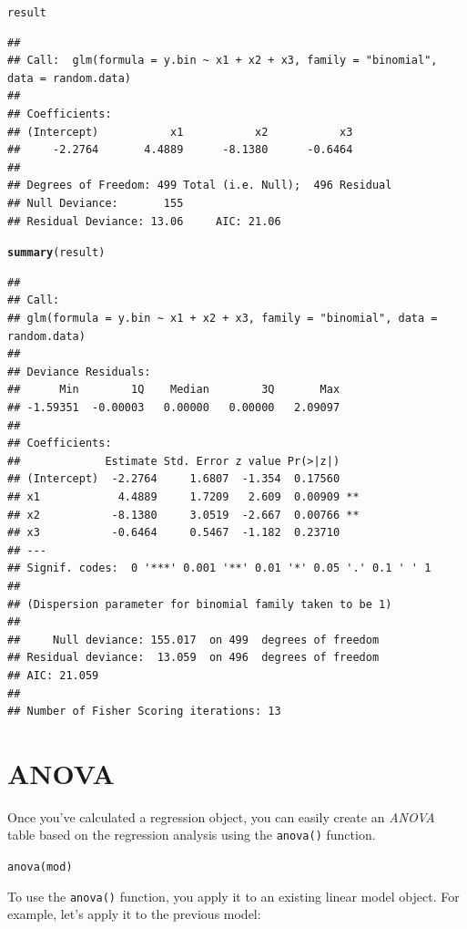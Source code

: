 \documentclass{tufte-book}\usepackage[]{graphicx}\usepackage[]{color}
\makeatletter
\newcommand{\hlstd}[1]{\textcolor[rgb]{0.345,0.345,0.345}{#1}}%
\newcommand{\hlkwd}[1]{\textcolor[rgb]{0.737,0.353,0.396}{\textbf{#1}}}%
\newenvironment{kframe}{%
 \def\at@end@of@kframe{}%
 \ifinner\ifhmode%
  \def\at@end@of@kframe{\end{minipage}}%
  \begin{minipage}{\columnwidth}%
 \fi\fi%
 \def\FrameCommand##1{\hskip\@totalleftmargin \hskip-\fboxsep
 \colorbox{shadecolor}{##1}\hskip-\fboxsep
     \hskip-\linewidth \hskip-\@totalleftmargin \hskip\columnwidth}%
 \MakeFramed {\advance\hsize-\width
   \@totalleftmargin\z@ \linewidth\hsize
   \@setminipage}}%
 {\par\unskip\endMakeFramed%
 \at@end@of@kframe}
\newenvironment{knitrout}{}{} %
\newcommand{\newfun}[1]{\begin{LARGE} \begin{center} \texttt{#1} \end{center} \end{LARGE}}
\makeatother
\begin{document}
\begin{footnotesize}
\begin{footnotesize}
\begin{knitrout}
\begin{kframe}
{\ttfamily\noindent\color{warningcolor}{\#\# Warning: glm.fit: fitted probabilities numerically 0 or 1 occurred}}\begin{alltt}
\hlstd{result}
\end{alltt}
\begin{verbatim}
## 
## Call:  glm(formula = y.bin ~ x1 + x2 + x3, family = "binomial", data = random.data)
## 
## Coefficients:
## (Intercept)           x1           x2           x3  
##     -2.2764       4.4889      -8.1380      -0.6464  
## 
## Degrees of Freedom: 499 Total (i.e. Null);  496 Residual
## Null Deviance:	    155 
## Residual Deviance: 13.06 	AIC: 21.06
\end{verbatim}
\begin{alltt}
\hlkwd{summary}\hlstd{(result)}
\end{alltt}
\begin{verbatim}
## 
## Call:
## glm(formula = y.bin ~ x1 + x2 + x3, family = "binomial", data = random.data)
## 
## Deviance Residuals: 
##      Min        1Q    Median        3Q       Max  
## -1.59351  -0.00003   0.00000   0.00000   2.09097  
## 
## Coefficients:
##             Estimate Std. Error z value Pr(>|z|)   
## (Intercept)  -2.2764     1.6807  -1.354  0.17560   
## x1            4.4889     1.7209   2.609  0.00909 **
## x2           -8.1380     3.0519  -2.667  0.00766 **
## x3           -0.6464     0.5467  -1.182  0.23710   
## ---
## Signif. codes:  0 '***' 0.001 '**' 0.01 '*' 0.05 '.' 0.1 ' ' 1
## 
## (Dispersion parameter for binomial family taken to be 1)
## 
##     Null deviance: 155.017  on 499  degrees of freedom
## Residual deviance:  13.059  on 496  degrees of freedom
## AIC: 21.059
## 
## Number of Fisher Scoring iterations: 13
\end{verbatim}
\end{kframe}
\end{knitrout}
\end{footnotesize}


\section{ANOVA}

Once you've calculated a regression object, you can easily create an \textit{ANOVA} table based on the regression analysis using the \texttt{anova()} function.

\newfun{anova(mod)}

To use the \texttt{anova()} function, you apply it to an existing linear model object. For example, let's apply it to the previous model:


\end{footnotesize}
\end{document}
